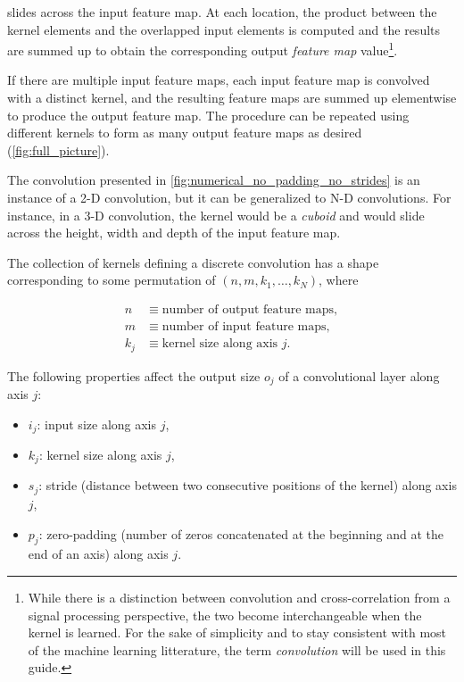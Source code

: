 \documentclass{report}
\begin{document}
slides across the input feature map. At each location, the product between the
kernel elements and the overlapped input elements is computed and the results
are summed up to obtain the corresponding output {\em feature map}
value\footnote{
    While there is a distinction between convolution and cross-correlation from
    a signal processing perspective, the two become interchangeable when the
    kernel is learned. For the sake of simplicity and to stay consistent with
    most of the machine learning litterature, the term {\em convolution}
    will be used in this guide.}.

If there are multiple input feature maps, each input feature map is convolved
with a distinct kernel, and the resulting feature maps are summed up elementwise
to produce the output feature map. The procedure can be repeated using different
kernels to form as many output feature maps as desired
(\autoref{fig:full_picture}).

The convolution presented in \autoref{fig:numerical_no_padding_no_strides} is an
instance of a 2-D convolution, but it can be generalized to N-D convolutions.
For instance, in a 3-D convolution, the kernel would be a {\em cuboid} and would
slide across the height, width and depth of the input feature map.

The collection of kernels defining a discrete convolution has a shape
corresponding to some permutation of $(n, m, k_1, \ldots, k_N)$, where

\begin{equation*}
\begin{split}
    n &\equiv \text{number of output feature maps},\\
    m &\equiv \text{number of input feature maps},\\
    k_j &\equiv \text{kernel size along axis $j$}.
\end{split}
\end{equation*}

The following properties affect the output size $o_j$ of a convolutional layer
along axis $j$:

\begin{itemize}
    \item $i_j$: input size along axis $j$,
    \item $k_j$: kernel size along axis $j$,
    \item $s_j$: stride (distance between two consecutive positions of the
        kernel) along axis $j$,
    \item $p_j$: zero-padding (number of zeros concatenated at the beginning and
        at the end of an axis) along axis $j$.
\end{itemize}
\end{document}
